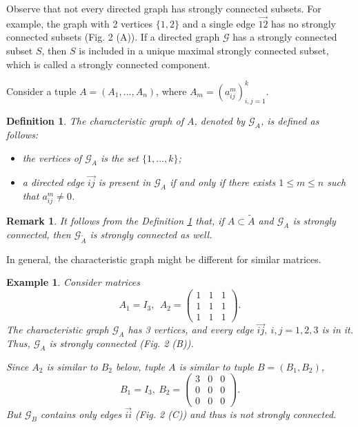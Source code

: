\documentclass[draft, 12pt, reqno]{amsart}
\numberwithin{equation}{section}
\theoremstyle{plain}
\newtheorem{example}[theorem]{Example}
\newtheorem{remark}[theorem]{Remark}
\newtheorem{definition}[theorem]{Definition}
\begin{document}
Observe that not every directed graph has strongly connected subsets. For example, the graph with 2 vertices $\{1,2\}$ and a single edge $\overrightarrow{12}$ has no strongly connected subsets (Fig. 2 (A)). If a directed graph $\mathcal{G}$ has a strongly connected subset $S$, then $S$ is included in a unique maximal strongly connected subset, which is called a strongly connected component.

Consider a tuple $A=(A_1,...,A_n)$, where $A_m=(a_{ij}^m)_{i,j=1}^k$. 
\begin{definition}\label{graph}
The {\em characteristic graph} of $A$, denoted by $\mathcal{G}_{A}$, is defined as follows:
\begin{itemize}
\item the vertices of $\mathcal{G}_{A}$ is the set $\{1,...,k\}$;
\item a directed edge $\overrightarrow{ij}$ is present in $\mathcal{G}_{A}$ if and only if  there exists $1\leq m\leq n$ such that $a_{ij}^m\neq 0$.	
\end{itemize}
\end{definition}

\begin{remark}\label{ext}
\normalfont It follows from the Definition \ref{graph} that, if $A\subset \widetilde{A}$ and $\mathcal{G}_A$ is strongly connected, then $\mathcal{G}_{\widetilde{A}}$ is strongly connected as well.
\end{remark}

In general, the characteristic graph might be different for similar matrices. 
\begin{example}
\normalfont  Consider matrices
$$A_1=I_3, \ \ A_2=\left ( \begin{array}{ccc} 1&1&1\\1&1&1 \\1&1 &1 \end{array}\right ). $$ 
The characteristic graph $\mathcal{G}_A$ has 3 vertices, and every edge $\overrightarrow{ij}, \ i,j=1,2,3$ is in it. Thus, $\mathcal{G}_A$ is strongly connected (Fig. 2 (B)).

Since $A_2$ is similar to $B_2$ below, tuple $A$ is similar to tuple $B=(B_1,B_2)$,
$$ B_1=I_3, \ B_2=\left ( \begin{array}{ccc} 3&0&0\\0&0&0 \\0&0 &0 \end{array}\right ).$$ 
But $\mathcal{G}_B$ contains only edges $\overrightarrow{ii}$ (Fig. 2 (C)) and thus is not strongly connected.

\end{example}
\end{document}
